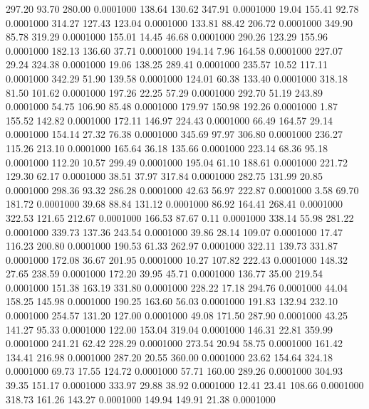  297.20   93.70  280.00   0.0001000
 138.64  130.62  347.91   0.0001000
  19.04  155.41   92.78   0.0001000
 314.27  127.43  123.04   0.0001000
 133.81   88.42  206.72   0.0001000
 349.90   85.78  319.29   0.0001000
 155.01   14.45   46.68   0.0001000
 290.26  123.29  155.96   0.0001000
 182.13  136.60   37.71   0.0001000
 194.14    7.96  164.58   0.0001000
 227.07   29.24  324.38   0.0001000
  19.06  138.25  289.41   0.0001000
 235.57   10.52  117.11   0.0001000
 342.29   51.90  139.58   0.0001000
 124.01   60.38  133.40   0.0001000
 318.18   81.50  101.62   0.0001000
 197.26   22.25   57.29   0.0001000
 292.70   51.19  243.89   0.0001000
  54.75  106.90   85.48   0.0001000
 179.97  150.98  192.26   0.0001000
   1.87  155.52  142.82   0.0001000
 172.11  146.97  224.43   0.0001000
  66.49  164.57   29.14   0.0001000
 154.14   27.32   76.38   0.0001000
 345.69   97.97  306.80   0.0001000
 236.27  115.26  213.10   0.0001000
 165.64   36.18  135.66   0.0001000
 223.14   68.36   95.18   0.0001000
 112.20   10.57  299.49   0.0001000
 195.04   61.10  188.61   0.0001000
 221.72  129.30   62.17   0.0001000
  38.51   37.97  317.84   0.0001000
 282.75  131.99   20.85   0.0001000
 298.36   93.32  286.28   0.0001000
  42.63   56.97  222.87   0.0001000
   3.58   69.70  181.72   0.0001000
  39.68   88.84  131.12   0.0001000
  86.92  164.41  268.41   0.0001000
 322.53  121.65  212.67   0.0001000
 166.53   87.67    0.11   0.0001000
 338.14   55.98  281.22   0.0001000
 339.73  137.36  243.54   0.0001000
  39.86   28.14  109.07   0.0001000
  17.47  116.23  200.80   0.0001000
 190.53   61.33  262.97   0.0001000
 322.11  139.73  331.87   0.0001000
 172.08   36.67  201.95   0.0001000
  10.27  107.82  222.43   0.0001000
 148.32   27.65  238.59   0.0001000
 172.20   39.95   45.71   0.0001000
 136.77   35.00  219.54   0.0001000
 151.38  163.19  331.80   0.0001000
 228.22   17.18  294.76   0.0001000
  44.04  158.25  145.98   0.0001000
 190.25  163.60   56.03   0.0001000
 191.83  132.94  232.10   0.0001000
 254.57  131.20  127.00   0.0001000
  49.08  171.50  287.90   0.0001000
  43.25  141.27   95.33   0.0001000
 122.00  153.04  319.04   0.0001000
 146.31   22.81  359.99   0.0001000
 241.21   62.42  228.29   0.0001000
 273.54   20.94   58.75   0.0001000
 161.42  134.41  216.98   0.0001000
 287.20   20.55  360.00   0.0001000
  23.62  154.64  324.18   0.0001000
  69.73   17.55  124.72   0.0001000
  57.71  160.00  289.26   0.0001000
 304.93   39.35  151.17   0.0001000
 333.97   29.88   38.92   0.0001000
  12.41   23.41  108.66   0.0001000
 318.73  161.26  143.27   0.0001000
 149.94  149.91   21.38   0.0001000
